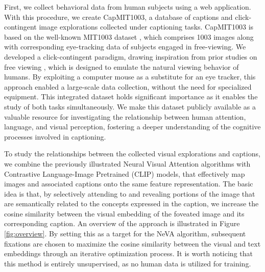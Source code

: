 \documentclass{article}
\begin{document}
First, we collect behavioral data from human subjects using a web application. With this procedure, we create CapMIT1003, a database of captions and click-contingent image explorations collected under captioning tasks. CapMIT1003 is based on the well-known MIT1003 dataset \citep{judd2009learning}, which comprises 1003 images along with corresponding eye-tracking data of subjects engaged in free-viewing. We developed a click-contingent paradigm, drawing inspiration from prior studies on free viewing \citep{jiang2015salicon}, which is designed to emulate the natural viewing behavior of humans. By exploiting a computer mouse as a substitute for an eye tracker, this approach enabled a large-scale data collection, without the need for specialized equipment. This integrated dataset holds significant importance as it enables the study of both tasks simultaneously. We make this dataset publicly available as a valuable resource for investigating the relationship between human attention, language, and visual perception, fostering a deeper understanding of the cognitive processes involved in captioning. 



To study the relationships between the collected visual explorations and  captions, we combine the previously illustrated Neural Visual Attention \citep{schwinn2022behind} algorithms with Contrastive Language-Image Pretrained (CLIP) \citep{radford2021learning} models, that effectively map images and associated captions onto the same feature representation. The basic idea is that, by selectively attending to and revealing portions of the image that are semantically related to the concepts expressed in the caption, we increase the cosine similarity between the visual embedding of the foveated image and its corresponding caption. An overview of the approach is illustrated in Figure \ref{fig:overview}. By setting this as a target for the NeVA algorithm, subsequent fixations are chosen to maximize the cosine similarity between the visual and text embeddings through an iterative optimization process. It is worth noticing that this method is entirely unsupervised, as no human data is utilized for training. 
\end{document}
